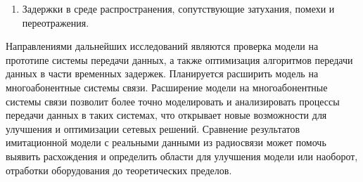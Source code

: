 \begin{onehalfspace}
\begin{enumerate}
    \item	Задержки в среде распространения, сопутствующие затухания, помехи и переотражения. 
 
	\end{enumerate}
 



 
Направлениями дальнейших исследований являются проверка модели на прототипе системы передачи данных, а также оптимизация алгоритмов передачи данных в части временных задержек. Планируется расширить модель на многоабонентные системы связи. Расширение модели на многоабонентные системы связи позволит более точно моделировать и анализировать процессы передачи данных в таких системах, что открывает новые возможности для улучшения и оптимизации сетевых решений. Сравнение результатов имитационной модели с реальными данными из радиосвязи может помочь выявить расхождения и определить области для улучшения модели или наоборот, отработки оборудования до теоретических пределов.
 

	



 
\end{onehalfspace} 
	\newpage



